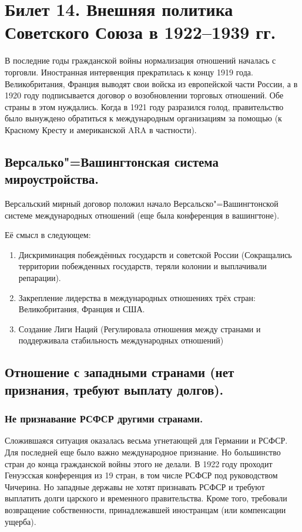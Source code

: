 \section{Билет 14. Внешняя политика Советского Союза в 1922--1939 гг.}

В последние годы гражданской войны нормализация отношений началась с торговли. Иностранная интервенция прекратилась к концу 1919 года. Великобритания, Франция выводят свои войска из европейской части России, а в 1920 году подписывается договор о возобновлении торговых отношений. Обе страны в этом нуждались. Когда в 1921 году разразился голод, правительство было вынуждено обратиться к международным организациям за помощью (к Красному Кресту и американской ARA в частности). 

\subsection{Версалько"=Вашингтонская система мироустройства.}

Версальский мирный договор положил начало Версальско"=Вашингтонской системе международных отношений (еще была конференция в вашингтоне). 

Её смысл в следующем:

\begin{enumerate}
    \item Дискриминация побеждённых государств и советской России (Сокращались территории побежденных государств, теряли колонии и выплачивали репарации).
    \item Закрепление лидерства в международных отношениях трёх стран: Великобритания, Франция и США.
    \item Создание Лиги Наций (Регулировала отношения между странами и поддерживала стабильность международных отношений)
\end{enumerate}

\subsection{Отношение с западными странами (нет признания, требуют выплату долгов).}

\subsubsection{\textbf{Не признавание РСФСР другими странами.}}

Сложившаяся ситуация оказалась весьма угнетающей для Германии и РСФСР. Для последней еще было важно международное признание. Но большинство стран до конца гражданской войны этого не делали. В 1922 году проходит Генуэсская конференция из 19 стран, в том числе РСФСР под руководством Чичерина. Но западные державы не хотят признавать РСФСР и требуют выплатить долги царского и временного правительства. Кроме того, требовали возвращение собственности, принадлежавшей иностранцам (или компенсации ущерба). 

